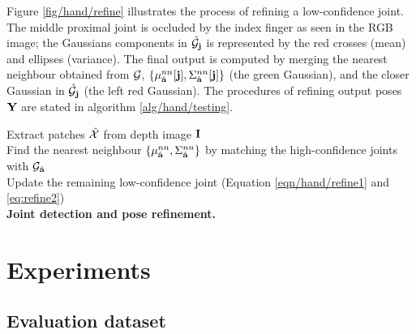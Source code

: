 Figure \ref{fig/hand/refine} illustrates the process of refining a low-confidence joint. The middle proximal joint is occluded by the index finger as seen in the RGB image; the Gaussians components in $\hat{\mathcal{G}}_{\mathbf{j}}$ is represented by the red crosses (mean) and ellipses (variance). The final output is computed by merging the nearest neighbour obtained from $\mathcal{G}$, \ie $\{\mu_{\hat{\mathbf{a}}}^{nn}[\mathbf{j}], \Sigma_{\hat{\mathbf{a}}}^{nn}[\mathbf{j}]\}$ (the green Gaussian), and the closer Gaussian in $\hat{\mathcal{G}}_{\mathbf{j}}$ (the left red Gaussian).  
The procedures of refining output poses $\mathbf{Y}$ are stated in algorithm \ref{alg/hand/testing}.  

\begin{algorithm}
	Extract patches $\hat{\mathcal{X}}$ from depth image $\mathbf{I}$ \\ 
	Find the nearest neighbour $\{\mu_{\hat{\mathbf{a}}}^{nn},\Sigma_{\hat{\mathbf{a}}}^{nn}\}$ by matching the high-confidence joints with $\mathcal{G}_{\hat{\mathbf{a}}}$\\ 
	Update the remaining low-confidence joint (Equation \ref{eqn/hand/refine1} and \ref{eq:refine2}) \\
	\caption{\textbf{Joint detection and pose refinement.}} 
	\label{alg/hand/testing}
\end{algorithm}

\section{Experiments}
\label{sec/hand/experiments}

\subsection{Evaluation dataset} 

